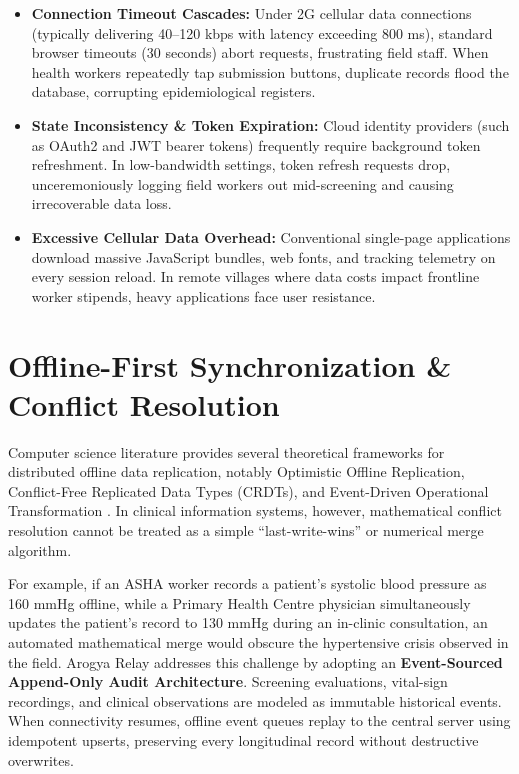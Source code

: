 \documentclass[12pt,a4paper,oneside]{report}
\begin{document}
\begin{itemize}[leftmargin=1.5em,itemsep=1pt,topsep=1pt,parsep=0pt]
    \item \textbf{Connection Timeout Cascades:} Under 2G cellular data connections (typically delivering 40--120 kbps with latency exceeding 800 ms), standard browser timeouts (30 seconds) abort requests, frustrating field staff. When health workers repeatedly tap submission buttons, duplicate records flood the database, corrupting epidemiological registers.
    \item \textbf{State Inconsistency \& Token Expiration:} Cloud identity providers (such as OAuth2 and JWT bearer tokens) frequently require background token refreshment. In low-bandwidth settings, token refresh requests drop, unceremoniously logging field workers out mid-screening and causing irrecoverable data loss.
    \item \textbf{Excessive Cellular Data Overhead:} Conventional single-page applications download massive JavaScript bundles, web fonts, and tracking telemetry on every session reload. In remote villages where data costs impact frontline worker stipends, heavy applications face user resistance.
\end{itemize}

\section{Offline-First Synchronization \& Conflict Resolution}
Computer science literature provides several theoretical frameworks for distributed offline data replication, notably Optimistic Offline Replication, Conflict-Free Replicated Data Types (CRDTs), and Event-Driven Operational Transformation \cite{kleppmann2017}. In clinical information systems, however, mathematical conflict resolution cannot be treated as a simple ``last-write-wins'' or numerical merge algorithm.

For example, if an ASHA worker records a patient's systolic blood pressure as 160 mmHg offline, while a Primary Health Centre physician simultaneously updates the patient's record to 130 mmHg during an in-clinic consultation, an automated mathematical merge would obscure the hypertensive crisis observed in the field. Arogya Relay addresses this challenge by adopting an \textbf{Event-Sourced Append-Only Audit Architecture}. Screening evaluations, vital-sign recordings, and clinical observations are modeled as immutable historical events. When connectivity resumes, offline event queues replay to the central server using idempotent upserts, preserving every longitudinal record without destructive overwrites.
\end{document}
